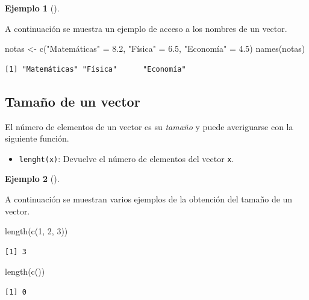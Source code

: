 \documentclass[
  a4paper,
]{scrreport}
\newenvironment{Shaded}{\begin{snugshade}}{\end{snugshade}}
\newcommand{\DecValTok}[1]{\textcolor[rgb]{0.68,0.00,0.00}{#1}}
\newcommand{\FloatTok}[1]{\textcolor[rgb]{0.68,0.00,0.00}{#1}}
\newcommand{\FunctionTok}[1]{\textcolor[rgb]{0.28,0.35,0.67}{#1}}
\newcommand{\NormalTok}[1]{\textcolor[rgb]{0.00,0.23,0.31}{#1}}
\newcommand{\OtherTok}[1]{\textcolor[rgb]{0.00,0.23,0.31}{#1}}
\newcommand{\StringTok}[1]{\textcolor[rgb]{0.13,0.47,0.30}{#1}}
\providecommand{\tightlist}{%
  \setlength{\itemsep}{0pt}\setlength{\parskip}{0pt}}\usepackage{longtable,booktabs,array}
\theoremstyle{definition}
\theoremstyle{definition}
\newtheorem{example}{Ejemplo}[chapter]
\theoremstyle{remark}
\begin{document}
\leavevmode{}%
\begin{example}[]\label{exm-acceso-nombres-vector}

A continuación se muestra un ejemplo de acceso a los nombres de un
vector.

\begin{Shaded}
\begin{Highlighting}[]
\NormalTok{notas }\OtherTok{\textless{}{-}} \FunctionTok{c}\NormalTok{(}\StringTok{"Matemáticas"} \OtherTok{=} \FloatTok{8.2}\NormalTok{, }\StringTok{"Física"} \OtherTok{=} \FloatTok{6.5}\NormalTok{, }\StringTok{"Economía"} \OtherTok{=} \FloatTok{4.5}\NormalTok{)}
\FunctionTok{names}\NormalTok{(notas)}
\end{Highlighting}
\end{Shaded}

\begin{verbatim}
[1] "Matemáticas" "Física"      "Economía"   
\end{verbatim}

\end{example}

\hypertarget{tamauxf1o-de-un-vector}{%
\subsection{Tamaño de un vector}\label{tamauxf1o-de-un-vector}}

El número de elementos de un vector es su \emph{tamaño} y puede
averiguarse con la siguiente función.

\begin{itemize}
\tightlist
\item
  \texttt{lenght(x)}: Devuelve el número de elementos del vector
  \texttt{x}.
\end{itemize}

\leavevmode{}%
\begin{example}[]\label{exm-tamaño-vector}

A continuación se muestran varios ejemplos de la obtención del tamaño de
un vector.

\begin{Shaded}
\begin{Highlighting}[]
\FunctionTok{length}\NormalTok{(}\FunctionTok{c}\NormalTok{(}\DecValTok{1}\NormalTok{, }\DecValTok{2}\NormalTok{, }\DecValTok{3}\NormalTok{))}
\end{Highlighting}
\end{Shaded}

\begin{verbatim}
[1] 3
\end{verbatim}

\begin{Shaded}
\begin{Highlighting}[]
\FunctionTok{length}\NormalTok{(}\FunctionTok{c}\NormalTok{())}
\end{Highlighting}
\end{Shaded}

\begin{verbatim}
[1] 0
\end{verbatim}

\end{example}
\end{document}

